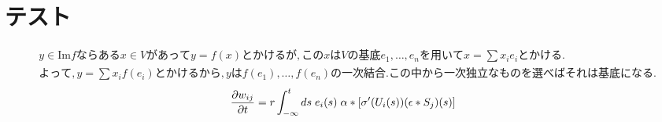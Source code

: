 \documentclass[a4j,dvipdfmx]{jsarticle}
\begin{document}
    \part*{テスト}
    \begin{align*}
        &y\in\mathrm{Im} f ならあるx\in Vがあってy=f(x)とかけるが, このxはVの基底e_1,\dots,e_nを用いてx=\sum x_{i}e_{i}とかける. \\ &よって, y=\sum x_{i}f(e_{i})とかけるから, yはf(e_1),\dots,f(e_n)の一次結合. この中から一次独立なものを選べばそれは基底になる.
    \end{align*}
    \begin{equation*}
        \frac{\partial w_{ij}}{\partial t} = r\int_{-\infty}^t ds\hspace{1mm}e_i(s)\hspace{1mm}\alpha *\left[\sigma'(U_i(s))(\epsilon*S_j)(s)\right]
    \end{equation*}
\end{document}
